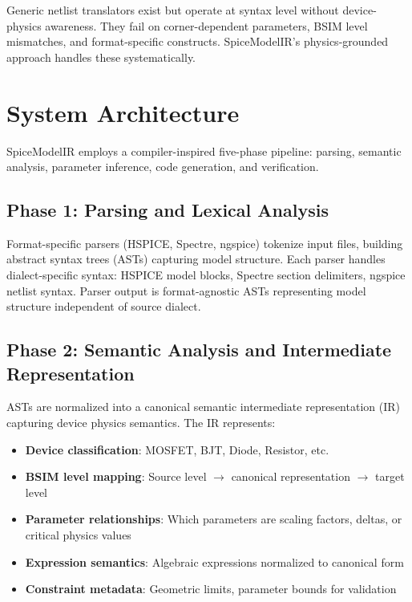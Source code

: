 \documentclass[conference]{IEEEtran}
\begin{document}
Generic netlist translators exist but operate at syntax level without device-physics awareness. They fail on corner-dependent parameters, BSIM level mismatches, and format-specific constructs. SpiceModelIR's physics-grounded approach handles these systematically.

\section{System Architecture}
\label{sec:architecture}

SpiceModelIR employs a compiler-inspired five-phase pipeline: parsing, semantic analysis, parameter inference, code generation, and verification.

\subsection{Phase 1: Parsing and Lexical Analysis}

Format-specific parsers (HSPICE, Spectre, ngspice) tokenize input files, building abstract syntax trees (ASTs) capturing model structure. Each parser handles dialect-specific syntax: HSPICE model blocks, Spectre section delimiters, ngspice netlist syntax. Parser output is format-agnostic ASTs representing model structure independent of source dialect.

\subsection{Phase 2: Semantic Analysis and Intermediate Representation}

ASTs are normalized into a canonical semantic intermediate representation (IR) capturing device physics semantics. The IR represents:
\begin{itemize}
\item \textbf{Device classification}: MOSFET, BJT, Diode, Resistor, etc.
\item \textbf{BSIM level mapping}: Source level $\rightarrow$ canonical representation $\rightarrow$ target level
\item \textbf{Parameter relationships}: Which parameters are scaling factors, deltas, or critical physics values
\item \textbf{Expression semantics}: Algebraic expressions normalized to canonical form
\item \textbf{Constraint metadata}: Geometric limits, parameter bounds for validation
\end{itemize}
\end{document}
